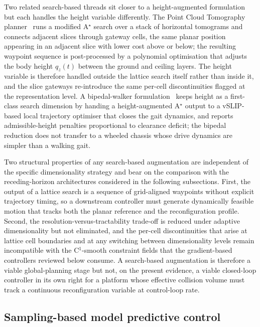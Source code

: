 \documentclass[11pt,a4paper]{article}
\begin{document}
Two related search-based threads sit closer to a height-augmented formulation but each handles the height variable differently. The Point Cloud Tomography planner~\parencite{yangEfficientGlobalNavigational2024} runs a modified A$^{\star}$ search over a stack of horizontal tomograms and connects adjacent slices through gateway cells, the same planar position appearing in an adjacent slice with lower cost above or below; the resulting waypoint sequence is post-processed by a polynomial optimisation that adjusts the body height $q_z(t)$ between the ground and ceiling layers. The height variable is therefore handled outside the lattice search itself rather than inside it, and the slice gateways re-introduce the same per-cell discontinuities flagged at the representation level. A bipedal-walker formulation~\parencite{liAutonomousNavigationUnderactuated2023} keeps height as a first-class search dimension by handing a height-augmented A$^{\star}$ output to a vSLIP-based local trajectory optimiser that closes the gait dynamics, and reports admissible-height penalties proportional to clearance deficit; the bipedal reduction does not transfer to a wheeled chassis whose drive dynamics are simpler than a walking gait.

Two structural properties of any search-based augmentation are independent of the specific dimensionality strategy and bear on the comparison with the receding-horizon architectures considered in the following subsections. First, the output of a lattice search is a sequence of grid-aligned waypoints without explicit trajectory timing, so a downstream controller must generate dynamically feasible motion that tracks both the planar reference and the reconfiguration profile. Second, the resolution-versus-tractability trade-off is reduced under adaptive dimensionality but not eliminated, and the per-cell discontinuities that arise at lattice cell boundaries and at any switching between dimensionality levels remain incompatible with the C$^{1}$-smooth constraint fields that the gradient-based controllers reviewed below consume. A search-based augmentation is therefore a viable global-planning stage but not, on the present evidence, a viable closed-loop controller in its own right for a platform whose effective collision volume must track a continuous reconfiguration variable at control-loop rate.

\subsection{Sampling-based model predictive control}
\label{sec:sq4:mppi}
\end{document}
